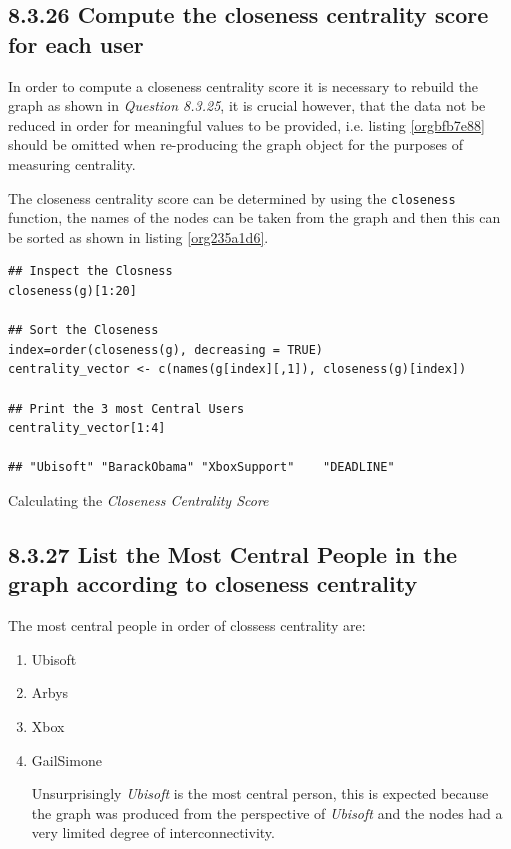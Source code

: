 \documentclass[11pt]{article}
\begin{document}
\subsection{8.3.26 Compute the \textbf{closeness} centrality score for each user}
\label{sec:orgdea2f40}
In order to compute a closeness centrality score it is necessary to rebuild the
graph as shown in \emph{Question 8.3.25}, it is crucial however, that the data
not be reduced in order for meaningful values to be provided, i.e. listing
\ref{orgbfb7e88} should be omitted when re-producing the graph object for the purposes of measuring centrality.

The closeness centrality score can be determined by using the \texttt{closeness} function, the names of the nodes can be taken from the graph and then this can be sorted as shown in listing \ref{org235a1d6}.

\begin{listing}[htbp]
\begin{verbatim}
## Inspect the Closness
closeness(g)[1:20]

## Sort the Closeness
index=order(closeness(g), decreasing = TRUE)
centrality_vector <- c(names(g[index][,1]), closeness(g)[index])

## Print the 3 most Central Users
centrality_vector[1:4]

## "Ubisoft" "BarackObama" "XboxSupport"    "DEADLINE"
\end{verbatim}
\caption{\label{org235a1d6}Calculating the \emph{Closeness Centrality Score}}
\end{listing}

\subsection{8.3.27 List the Most Central People in the graph according to closeness centrality}
\label{sec:org853a58d}
The most central people in order of clossess centrality are:

\begin{enumerate}
\item Ubisoft
\item Arbys
\item Xbox
\item GailSimone

Unsurprisingly \emph{Ubisoft} is the most central person, this is expected because the graph was produced from the perspective of \emph{Ubisoft} and the nodes had a very limited degree of interconnectivity.
\end{enumerate}
\end{document}
